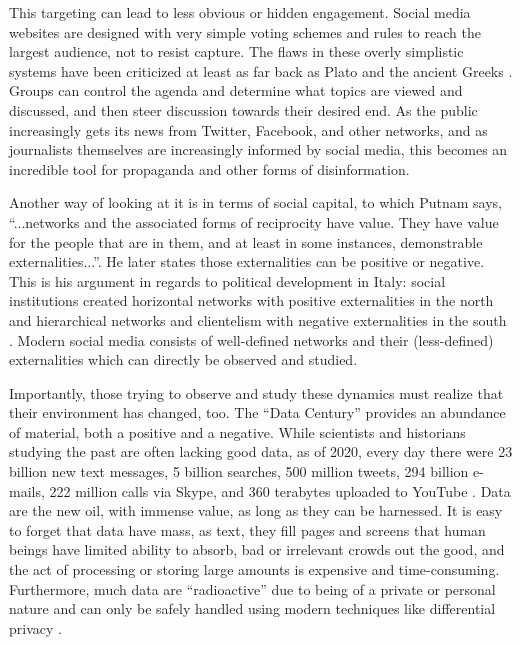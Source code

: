 \documentclass[doublespacing]{utdthesis}
\let\cite=\citep
\begin{document}
This targeting can lead to less obvious or hidden engagement.
Social media websites are designed with very simple voting schemes and rules to reach the largest audience, not to resist capture.
The flaws in these overly simplistic systems have been criticized at least as far back as Plato and the ancient Greeks \cite[1.7]{xenophon} \cite[VIII, 555b-562a]{plato}.
Groups can control the agenda and determine what topics are viewed and discussed, and then steer discussion towards their desired end.
As the public increasingly gets its news from Twitter, Facebook, and other
networks, and as journalists themselves are increasingly informed by social media, this becomes an incredible tool for propaganda and other forms of disinformation.

Another way of looking at it is in terms of social capital, to which Putnam \citeyear{putnam2000} says, ``...networks and the associated forms of reciprocity have value. They have value for the people that are in them, and at least in some instances, demonstrable externalities...''.
He later states those externalities can be positive or negative.
This is his argument in regards to political development in Italy: social
institutions created horizontal networks with positive externalities in the north and hierarchical networks and clientelism with negative externalities in the south \cite{putnam1993}.
Modern social media consists of well-defined networks and their (less-defined) externalities which can directly be observed and studied.

Importantly, those trying to observe and study these dynamics must realize that their environment has changed, too. 
The ``Data Century'' provides an abundance of material, both a positive and a negative.
While scientists and historians studying the past are often lacking good data, as of 2020, every day there were 23 billion new text messages, 5 billion searches, 500 million tweets, 294 billion e-mails, 222 million calls via Skype, and 360 terabytes uploaded to YouTube \cite{gill2021}.
Data are the new oil, with immense value, as long as they can be harnessed.
It is easy to forget that data have mass, as text, they fill pages and screens that human beings have limited ability to absorb, bad or irrelevant crowds out the good, and the act of processing or storing large amounts is expensive and time-consuming.
Furthermore, much data are ``radioactive'' due to being of a private or personal nature and can only be safely handled using modern techniques like differential privacy \cite{d2015}.
\end{document}
